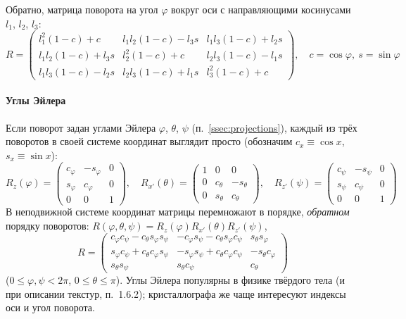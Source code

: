 Обратно, матрица поворота на угол $\varphi$ вокруг оси с направляющими
косинусами $l_1$, $l_2$, $l_3$:
\begin{equation}\label{eq:R-axis}
R=\begin{pmatrix}
l_1^2(1-c)+c & l_1l_2(1-c)-l_3s & l_1l_3(1-c)+l_2s\\
l_1l_2(1-c)+l_3s & l_2^2(1-c)+c & l_2l_3(1-c)-l_1s\\
l_1l_3(1-c)-l_2s & l_2l_3(1-c)+l_1s & l_3^2(1-c)+c
\end{pmatrix},\quad c=\cos\varphi,\ s=\sin\varphi
\end{equation}

\paragraph{Углы Эйлера}
Если поворот задан углами Эйлера $\varphi$, $\theta$, $\psi$ (п.~\ref{ssec:projections}),
каждый из трёх поворотов в своей системе координат выглядит просто
(обозначим $c_x\equiv\cos x$, $s_x\equiv\sin x$):
\[
R_z(\varphi)=\begin{pmatrix}c_\varphi&-s_\varphi&0\\s_\varphi&c_\varphi&0\\0&0&1\end{pmatrix},\quad
R_{x'}(\theta)=\begin{pmatrix}1&0&0\\0&c_\theta&-s_\theta\\0&s_\theta&c_\theta\end{pmatrix},\quad
R_{z'}(\psi)=\begin{pmatrix}c_\psi&-s_\psi&0\\s_\psi&c_\psi&0\\0&0&1\end{pmatrix}
\]
В неподвижной системе координат матрицы перемножают в порядке,
\emph{обратном} порядку поворотов: $R(\varphi,\theta,\psi)=R_z(\varphi)R_{x'}(\theta)R_{z'}(\psi)$,
\begin{equation}\label{eq:euler}
R=\begin{pmatrix}
c_\varphi c_\psi-c_\theta s_\varphi s_\psi & -c_\varphi s_\psi-c_\theta s_\varphi c_\psi & s_\theta s_\varphi\\
s_\varphi c_\psi+c_\theta c_\varphi s_\psi & -s_\varphi s_\psi+c_\theta c_\varphi c_\psi & -s_\theta c_\varphi\\
s_\theta s_\psi & s_\theta c_\psi & c_\theta
\end{pmatrix}
\end{equation}
($0\le\varphi,\psi<2\pi$, $0\le\theta\le\pi$).
Углы Эйлера популярны в физике твёрдого тела (и при описании текстур,
п.~1.6.2); кристаллографа же чаще интересуют индексы оси и угол поворота.

